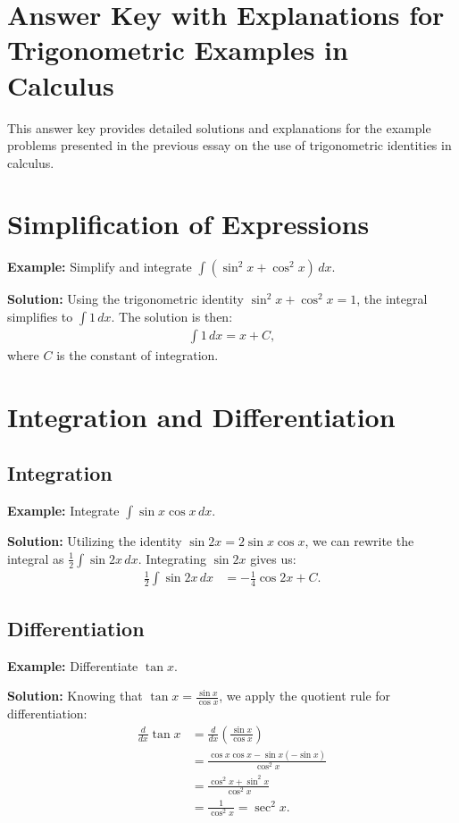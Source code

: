 \documentclass[a4paper,12pt]{book}
\newcounter{problem}
\newcounter{example}
\begin{document}
\section*{Answer Key with Explanations for Trigonometric Examples in Calculus}
This answer key provides detailed solutions and explanations for the example problems presented in the previous essay on the use of trigonometric identities in calculus.

\section{Simplification of Expressions}

\textbf{Example:} Simplify and integrate $\int (\sin^2 x + \cos^2 x) \, dx$.

\textbf{Solution:}
Using the trigonometric identity $\sin^2 x + \cos^2 x = 1$, the integral simplifies to $\int 1 \, dx$. The solution is then:
\begin{align*}
\int 1 \, dx = x + C,
\end{align*}
where $C$ is the constant of integration.

\section{Integration and Differentiation}

\subsection{Integration}

\textbf{Example:} Integrate $\int \sin x \cos x \, dx$.

\textbf{Solution:}
Utilizing the identity $\sin 2x = 2 \sin x \cos x$, we can rewrite the integral as $\frac{1}{2} \int \sin 2x \, dx$. Integrating $\sin 2x$ gives us:
\begin{align*}
\frac{1}{2} \int \sin 2x \, dx &= -\frac{1}{4} \cos 2x + C.
\end{align*}

\subsection{Differentiation}

\textbf{Example:} Differentiate $\tan x$.

\textbf{Solution:}
Knowing that $\tan x = \frac{\sin x}{\cos x}$, we apply the quotient rule for differentiation:
\begin{align*}
\frac{d}{dx} \tan x &= \frac{d}{dx} \left( \frac{\sin x}{\cos x} \right) \\
&= \frac{\cos x \cos x - \sin x (-\sin x)}{\cos^2 x} \\
&= \frac{\cos^2 x + \sin^2 x}{\cos^2 x} \\
&= \frac{1}{\cos^2 x} = \sec^2 x.
\end{align*}
\end{document}
